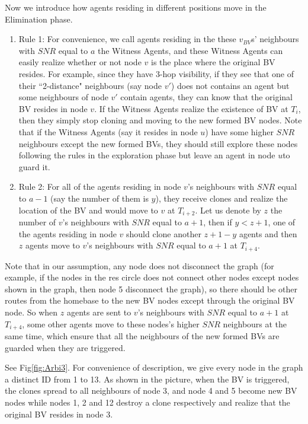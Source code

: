 Now we introduce how agents residing in different positions move in the Elimination phase.
\begin{enumerate}

\item Rule 1: For convenience, we call agents residing in the these $v_{BV}$s' neighbours with $SNR$ equal to $a$ the Witness Agents, and these Witness Agents can easily realize whether or not node $v$ is the place where the original BV resides. For example, since they have 3-hop visibility, if they see that one of their ``2-distance" neighbours (say node $v'$) does not contains an agent but some neighbours of node $v'$ contain agents, they can know that the original BV resides in node $v$. If the Witness Agents realize the existence of BV at $T_i$, then they simply stop cloning and moving to the new formed BV nodes. Note that if the Witness Agents (say it resides in node $u$) have some higher $SNR$ neighbours except the new formed BVs, they should still explore these nodes following the rules in the exploration phase but leave an agent in node $u$to guard it.  

\item Rule 2: For all of the agents residing in node $v$'s neighbours with $SNR$ equal to $a-1$ (say the number of them is $y$), they receive clones and realize the location of the BV and would move to $v$ at $T_{i+2}$. Let us denote by $z$ the number of $v$'s neighbours with $SNR$ equal to $a+1$, then if $y< z+1$, one of the agents residing in node $v$ should clone another $z+1-y$ agents and then $z$ agents move to $v$'s neighbours with $SNR$ equal to $a+1$ at $T_{i+4}$.
\end{enumerate}

Note that in our assumption, any node does not disconnect the graph (for example, if the nodes in the res circle does not connect other nodes except nodes shown in the graph, then node 5 disconnect the graph), so there should be other routes from the homebase to the new BV nodes except through the original BV node. So when $z$ agents are sent to $v$'s neighbours with $SNR$ equal to $a+1$ at $T_{i+4}$, some other agents move to these nodes's higher $SNR$ neighbours at the same time, which ensure that all the neighbours of the new formed BVs are guarded when they are triggered. 

See Fig\ref{fig:Arbi3}. For convenience of description, we give every node in the graph a distinct ID from 1 to 13. As shown in the picture, when the BV is triggered, the clones spread to all neighbours of node 3, and node 4 and 5 become new BV nodes while nodes 1, 2 and 12 destroy a clone respectively and realize that the original BV resides in node 3. 

